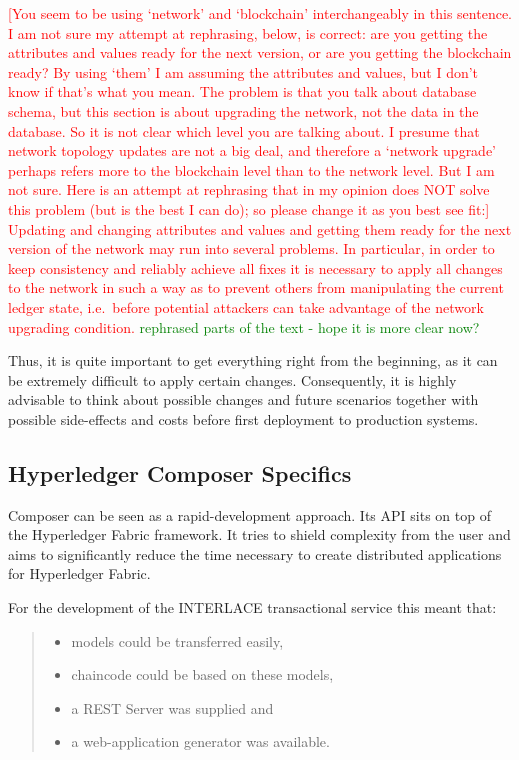 \textcolor{red}{[You seem to be using `network' and `blockchain' interchangeably in this sentence. I am not sure my attempt at rephrasing, below, is correct: are you getting the attributes and values ready for the next version, or are you getting the blockchain ready? By using `them' I am assuming the attributes and values, but I don't know if that's what you mean. The problem is that you talk about database schema, but this section is about upgrading the network, not the data in the database. So it is not clear which level you are talking about. I presume that network topology updates are not a big deal, and therefore a `network upgrade' perhaps refers more to the blockchain level than to the network level. But I am not sure. Here is an attempt at rephrasing that in my opinion does NOT solve this problem (but is the best I can do); so please change it as you best see fit:] Updating and changing attributes and values and getting them ready for the next version of the network may run into several problems. In particular, in order to keep consistency and reliably achieve all fixes it is necessary to apply all changes to the network in such a way as to prevent others from manipulating the current ledger state, i.e.\ before potential attackers can take advantage of the network upgrading condition.} \textcolor{green}{rephrased parts of the text - hope it is more clear now?}

Thus, it is quite important to get everything right from the beginning, as it can be extremely difficult to apply certain changes. Consequently, it is highly advisable to think about possible changes and future scenarios together with possible side-effects and costs before first deployment to production systems.

\subsection{Hyperledger Composer Specifics}

Composer can be seen as a rapid-development approach. Its API sits on top of the Hyperledger Fabric framework. It tries to shield complexity from the user and aims to significantly reduce the time necessary to create distributed applications for Hyperledger Fabric.

For the development of the INTERLACE transactional service this meant that:
\begin{quote}
\begin{itemize}
	\item models could be transferred easily,
	\item chaincode could be based on these models,
	\item a REST Server was supplied and
	\item a web-application generator was available.
\end{itemize}
\end{quote}


